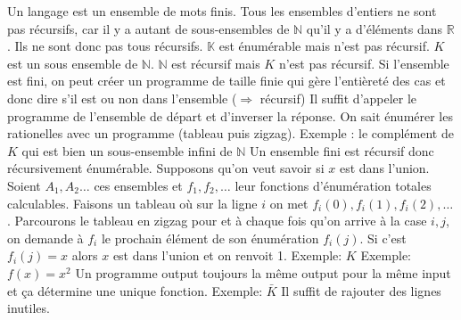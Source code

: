 \begin{mcqs}
  {Un langage est un ensemble de mots finis. Tous les ensembles d'entiers ne sont pas récursifs, car il y a autant de sous-ensembles de $\mathbb{N}$ qu'il y a d'éléments dans $\mathbb{R}$. Ils ne sont donc pas tous récursifs.}
  {$\mathbb{K}$ est énumérable mais n'est pas récursif.}
  {$K$ est un sous ensemble de $\mathbb{N}$. $\mathbb{N}$ est récursif mais $K$ n'est pas récursif.}
  {Si l'ensemble est fini, on peut créer un programme de taille finie qui gère l'entièreté des cas et donc dire s'il est ou non dans l'ensemble ($\Rightarrow$ récursif)}
  {Il suffit d'appeler le programme de l'ensemble de départ et d'inverser la réponse.}
  {On sait énumérer les rationelles avec un programme (tableau puis zigzag).}
  {Exemple : le complément de $K$ qui est bien un sous-ensemble infini de $\mathbb{N}$}
  {Un ensemble fini est récursif donc récursivement énumérable.}
  {Supposons qu'on veut savoir si $x$ est dans l'union.
   Soient $A_1, A_2 \ldots$ ces ensembles et $f_1, f_2, \ldots$ leur fonctions d'énumération totales calculables.
   Faisons un tableau où sur la ligne $i$ on met $f_i(0), f_i(1), f_i(2), \ldots$.
   Parcourons le tableau en zigzag pour et à chaque fois qu'on arrive à la case $i,j$, on demande à $f_i$ le prochain élément
   de son énumération $f_i(j)$.
   Si c'est $f_i(j) = x$ alors $x$ est dans l'union et on renvoit 1.}
  {Exemple: $K$}
  {Exemple: $f(x) = x^2$}
  {Un programme output toujours la même output pour la même input et ça détermine une unique fonction.}
  {Exemple: $\bar{K}$}
  {Il suffit de rajouter des lignes inutiles.}

\end{mcqs}
